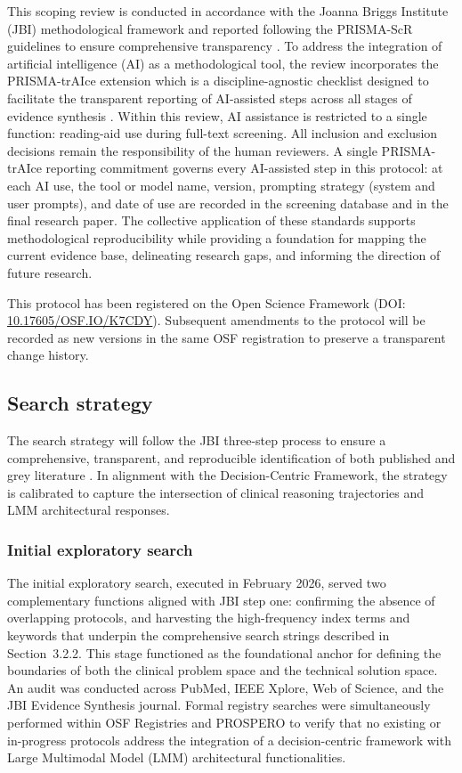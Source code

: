 \documentclass[review,12pt]{elsarticle}
\begin{document}
This scoping review is conducted in accordance with the Joanna Briggs Institute (JBI) methodological framework \cite{Aromataris2024JBI} and reported following the PRISMA-ScR guidelines to ensure comprehensive transparency \cite{Tricco2018}. To address the integration of artificial intelligence (AI) as a methodological tool, the review incorporates the PRISMA-trAIce extension which is a discipline-agnostic checklist designed to facilitate the transparent reporting of AI-assisted steps across all stages of evidence synthesis \cite{holst2025prisma_traice}.  Within this review, AI assistance is restricted to a single function: reading-aid use during full-text screening. All inclusion and exclusion decisions remain the responsibility of the human reviewers.  A single PRISMA-trAIce reporting commitment governs every AI-assisted step in this protocol: at each AI use, the tool or model name, version, prompting strategy (system and user prompts), and date of use are recorded in the screening database and in the final research paper. The collective application of these standards supports methodological reproducibility while providing a foundation for mapping the current evidence base, delineating research gaps, and informing the direction of future research.

 This protocol has been registered on the Open Science Framework (DOI: \href{https://doi.org/10.17605/OSF.IO/K7CDY}{10.17605/OSF.IO/K7CDY}). Subsequent amendments to the protocol will be recorded as new versions in the same OSF registration to preserve a transparent change history.

\subsection{Search strategy}

The search strategy will follow the JBI three-step process to ensure a comprehensive, transparent, and reproducible identification of both published and grey literature \cite{Aromataris2024JBI}. In alignment with the Decision-Centric Framework, the strategy is calibrated to capture the intersection of clinical reasoning trajectories and LMM architectural responses.


\subsubsection{Initial exploratory search}

 The initial exploratory search, executed in February 2026, served two complementary functions aligned with JBI step one: confirming the absence of overlapping protocols, and harvesting the high-frequency index terms and keywords that underpin the comprehensive search strings described in Section~3.2.2. This stage functioned as the foundational anchor for defining the boundaries of both the clinical problem space and the technical solution space. An audit was conducted across PubMed, IEEE Xplore, Web of Science, and the JBI Evidence Synthesis journal. Formal registry searches were simultaneously performed within OSF Registries and PROSPERO to verify that no existing or in-progress protocols address the integration of a decision-centric framework with Large Multimodal Model (LMM) architectural functionalities.
\end{document}
